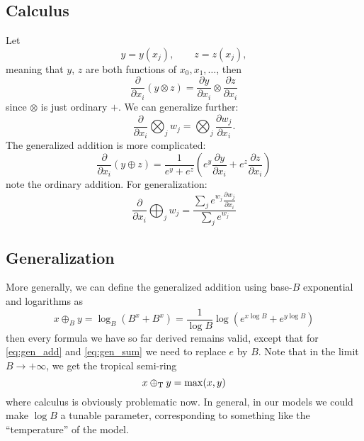 \documentclass[a4paper]{article}
\begin{document}

\subsection{Calculus}

Let
\begin{equation}
y = y(x_j), \qquad z = z(x_j),
\end{equation}
meaning that $y$, $z$ are both functions of $x_0, x_1, \ldots$, then
\begin{equation}
\frac{\partial}{\partial x_i}(y \otimes z) = \frac{\partial y}{\partial x_i}\otimes\frac{\partial z}{\partial x_i}
\end{equation}
since $\otimes$ is just ordinary $+$. We can generalize further:
\begin{equation}
\frac{\partial}{\partial x_i}\bigotimes_j w_j = \bigotimes_j \frac{\partial w_j}{\partial x_i}.
\end{equation}
The generalized addition is more complicated:
\begin{equation}
\label{eq:gen_add}
\frac{\partial}{\partial x_i}(y\oplus z) = \frac{1}{e^y+e^z}\left(e^y \frac{\partial y}{\partial x_i} + e^z \frac{\partial z}{\partial x_i}\right)
\end{equation}
note the ordinary addition. For generalization:
\begin{equation}
\label{eq:gen_sum}
\frac{\partial}{\partial x_i}\bigoplus_j w_j = \frac{\sum_j e^{w_j}\frac{\partial w_j}{\partial x_i}}{\sum_j e^{w_j}}
\end{equation}

\subsection{Generalization}

More generally, we can define the generalized addition using base-$B$ exponential and logarithms as
\begin{equation}
x\oplus_B y = \log_B(B^x+B^x) = \frac{1}{\log B}\log(e^{x\log B} + e^{y \log B})
\end{equation}
then every formula we have so far derived remains valid, except that for \eqref{eq:gen_add} and \eqref{eq:gen_sum} we need to replace $e$ by $B$. Note that in the limit $B\rightarrow +\infty$, we get the tropical semi-ring
\begin{equation}
x\oplus_{\rm{T}} y = \max(x,y)
\end{equation}
where calculus is obviously problematic now. In general, in our models we could make $\log B$ a tunable parameter, corresponding to something like the ``temperature'' of the model.
\end{document}

